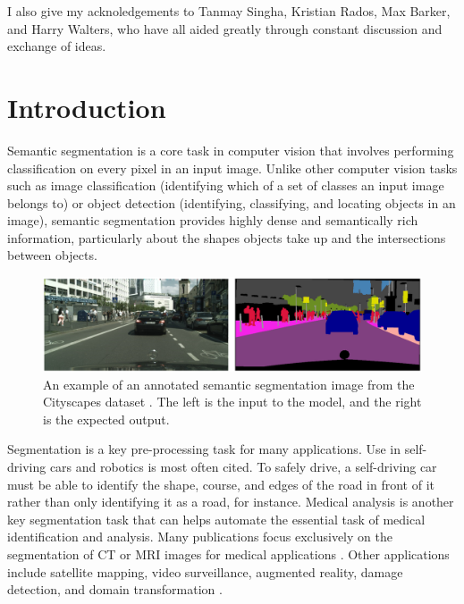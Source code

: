\documentclass[a4paper,12pt]{report}
\begin{document}
\noindent I also give my acknoledgements to Tanmay Singha, Kristian Rados, Max Barker, and Harry Walters, who have all aided greatly through constant discussion and exchange of ideas.

\newpage
\tableofcontents
\newpage
\listoffigures
\newpage
\listoftables
\newpage
\thispagestyle{empty}

% 
% 

\chapter{Introduction}
Semantic segmentation is a core task in computer vision that involves performing classification on every pixel in an input image. Unlike other computer vision tasks such as image classification (identifying which of a set of classes an input image belongs to) or object detection (identifying, classifying, and locating objects in an image), semantic segmentation provides highly dense and semantically rich information, particularly about the shapes objects take up and the intersections between objects.

\begin{figure}[h]
    \centering
    \includegraphics[width=\textwidth]{res/cityscapes-segmentation-sample.png}
    \caption{An example of an annotated semantic segmentation image from the Cityscapes dataset \cite{cordts_cityscapes_2016}. The left is the input to the model, and the right is the expected output.}
    \label{fig:cityscapes_segmentation_example}
\end{figure}

Segmentation is a key pre-processing task for many applications. Use in self-driving cars and robotics is most often cited. To safely drive, a self-driving car must be able to identify the shape, course, and edges of the road in front of it rather than only identifying it as a road, for instance. Medical analysis is another key segmentation task that can helps automate the essential task of medical identification and analysis. Many publications focus exclusively on the segmentation of CT or MRI images for medical applications \cite{hesamian_deep_2019}. Other applications include satellite mapping, video surveillance, augmented reality, damage detection, and domain transformation \cite{richter_enhancing_2021}.
\end{document}

